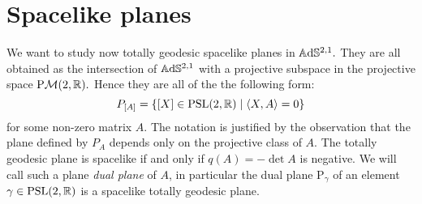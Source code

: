 \section{Spacelike planes}
We want to study now totally geodesic spacelike planes in $\mathbb{A}\mathrm{d}\mathbb{S}^{2,1}.$ They are all obtained as the intersection of $\mathbb{A}\mathrm{d}\mathbb{S}^{2,1}$ with a projective subspace in the projective space $\text{P}\mathcal{M}(2,\mathbb{R}).$ Hence they are all of the the following form: 
\begin{equation}\label{geoplanes}
    P_{[A]}=\{[X]\in\text{PSL}(2,\mathbb{R})\;|\;\langle X,A\rangle=0\}
\end{equation}
for some non-zero matrix $A$. The notation is justified by the observation that the plane defined by $P_A$ depends only on the projective class of $A$. The totally geodesic plane is spacelike if and only if $q(A)=-\det A$ is negative. We will call such a plane \textit{dual plane} of $A$, in particular the dual plane $\text{P}_\gamma$  of an element $\gamma\in\text{PSL}(2,\mathbb{R})$ is a spacelike totally geodesic plane. \\
